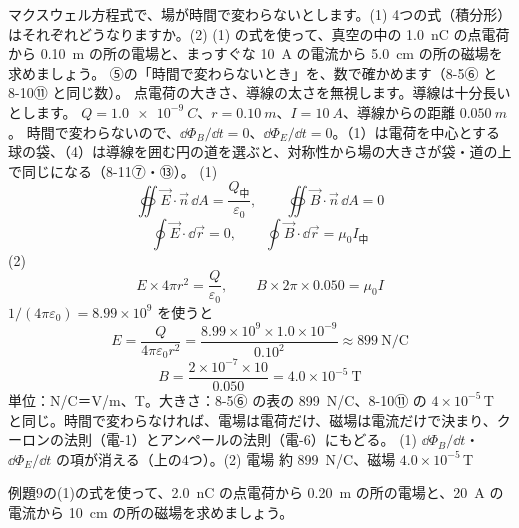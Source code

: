 \begin{phreidai}
\label{ph:電-14:ex9}マクスウェル方程式で、場が時間で変わらないとします。(1) 4つの式（積分形）はそれぞれどうなりますか。(2) (1) の式を使って、真空の中の \qty{1.0}{nC} の点電荷から \qty{0.10}{m} の所の電場と、まっすぐな \qty{10}{A} の電流から \qty{5.0}{cm} の所の磁場を求めましょう。
\phbamen
⑤の「時間で変わらないとき」を、数で確かめます（8-5⑥ と 8-10⑪ と同じ数）。
\phmushi
点電荷の大きさ、導線の太さを無視します。導線は十分長いとします。
\phzu
$Q=\qty{1.0e-9}{C}$、$r=\qty{0.10}{m}$、$I=\qty{10}{A}$、導線からの距離 $\qty{0.050}{m}$。
\phriyu
時間で変わらないので、$\dd\Phi_B/\dd t=0$、$\dd\Phi_E/\dd t=0$。（1）は電荷を中心とする球の袋、（4）は導線を囲む円の道を選ぶと、対称性から場の大きさが袋・道の上で同じになる（8-11⑦・⑬）。
\phtateru
(1)
\[ \oiint\vec E\cdot\vec n\,\dd A=\frac{Q_{\text{中}}}{\varepsilon_0},\qquad \oiint\vec B\cdot\vec n\,\dd A=0 \]
\[ \oint\vec E\cdot\dd\vec r=0,\qquad \oint\vec B\cdot\dd\vec r=\mu_0I_{\text{中}} \]
(2)
\[ E\times4\pi r^2=\frac{Q}{\varepsilon_0},\qquad B\times2\pi\times0.050=\mu_0I \]
\phtoku
$1/(4\pi\varepsilon_0)=8.99\times10^9$ を使うと
\[ E=\frac{Q}{4\pi\varepsilon_0r^2}=\frac{8.99\times10^9\times1.0\times10^{-9}}{0.10^2}\approx899\ \mathrm{N/C} \]
\[ B=\frac{2\times10^{-7}\times10}{0.050}=4.0\times10^{-5}\ \mathrm{T} \]
\phtashikame
単位：N/C＝V/m、T。大きさ：8-5⑥ の表の \qty{899}{N/C}、8-10⑪ の $4\times10^{-5}$\,T と同じ。時間で変わらなければ、電場は電荷だけ、磁場は電流だけで決まり、クーロンの法則（電-1）とアンペールの法則（電-6）にもどる。
\kotae (1) $\dd\Phi_B/\dd t$・$\dd\Phi_E/\dd t$ の項が消える（上の4つ）。(2) 電場 約 \qty{899}{N/C}、磁場 $4.0\times10^{-5}$\,T
\end{phreidai}
\begin{jibun}
例題9の(1)の式を使って、\qty{2.0}{nC} の点電荷から \qty{0.20}{m} の所の電場と、\qty{20}{A} の電流から \qty{10}{cm} の所の磁場を求めましょう。
\end{jibun}

